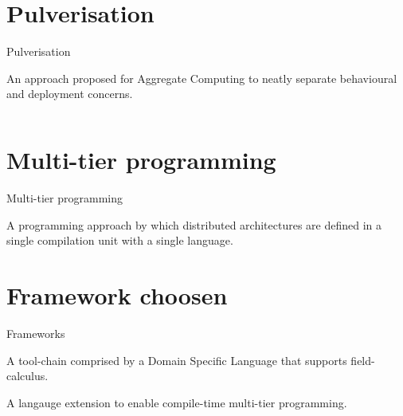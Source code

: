 \documentclass[aspectratio=169]{beamer}
\begin{document}
\section{Pulverisation}
\begin{frame}{Pulverisation~\cite{DBLP:journals/fi/CasadeiPPVW20}}
  \begin{cardTiny}
    {
      \color{accent} An approach proposed for Aggregate Computing 
      to neatly separate behavioural and deployment concerns. 
    }
  \end{cardTiny}
  \begin{columns}
    \begin{column}{0.45\textwidth}
    \end{column}
    \begin{column}{0.38\textwidth}
    \end{column}
  \end{columns}
\end{frame}
\section{Multi-tier programming}
\begin{frame}{Multi-tier programming~\cite{DBLP:journals/csur/WeisenburgerWS20}}
  \begin{cardTiny}
  {
    \color{accent} A programming approach by which distributed architectures 
    are defined in a single compilation unit with a single language. 
  }
  \end{cardTiny}
  \centering
\end{frame}
\section{Framework choosen}
\begin{frame}{Frameworks}
  \begin{card}
    A tool-chain comprised by a Domain Specific Language that supports field-calculus.
  \end{card}
  \pause
  \begin{card}
    A langauge extension to enable compile-time multi-tier programming.\\
  \end{card}
\end{frame}
\end{document}
